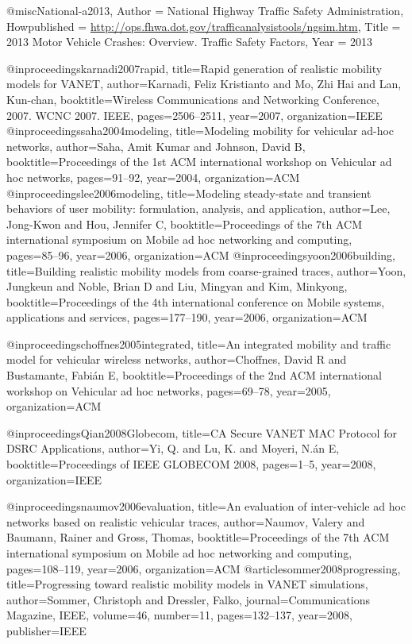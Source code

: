{{{{{{{{@misc{National-a2013,
	Author = {National Highway Traffic Safety Administration},
	Howpublished = {\url{http://ops.fhwa.dot.gov/trafficanalysistools/ngsim.htm}},
	Title = {2013 Motor Vehicle Crashes: Overview. Traffic Safety Factors},
	Year = {2013}
	}

	@inproceedings{karnadi2007rapid,
	  title={Rapid generation of realistic mobility models for VANET},
	  author={Karnadi, Feliz Kristianto and Mo, Zhi Hai and Lan, Kun-chan},
	  booktitle={Wireless Communications and Networking Conference, 2007. WCNC 2007. IEEE},
	  pages={2506--2511},
	  year={2007},
	  organization={IEEE}
	}
	@inproceedings{saha2004modeling,
  title={Modeling mobility for vehicular ad-hoc networks},
  author={Saha, Amit Kumar and Johnson, David B},
  booktitle={Proceedings of the 1st ACM international workshop on Vehicular ad hoc networks},
  pages={91--92},
  year={2004},
  organization={ACM}
}
@inproceedings{lee2006modeling,
  title={Modeling steady-state and transient behaviors of user mobility: formulation, analysis, and application},
  author={Lee, Jong-Kwon and Hou, Jennifer C},
  booktitle={Proceedings of the 7th ACM international symposium on Mobile ad hoc networking and computing},
  pages={85--96},
  year={2006},
  organization={ACM}
}
@inproceedings{yoon2006building,
  title={Building realistic mobility models from coarse-grained traces},
  author={Yoon, Jungkeun and Noble, Brian D and Liu, Mingyan and Kim, Minkyong},
  booktitle={Proceedings of the 4th international conference on Mobile systems, applications and services},
  pages={177--190},
  year={2006},
  organization={ACM}
}

@inproceedings{choffnes2005integrated,
	title={An integrated mobility and traffic model for vehicular wireless networks},
	author={Choffnes, David R and Bustamante, Fabi{\'a}n E},
	booktitle={Proceedings of the 2nd ACM international workshop on Vehicular ad hoc networks},
	pages={69--78},
	year={2005},
	organization={ACM}
}

@inproceedings{Qian2008Globecom,
	title={CA Secure VANET MAC Protocol for DSRC Applications},
	author={Yi, Q. and Lu, K. and Moyeri, N.{\'a}n E},
	booktitle={Proceedings of IEEE GLOBECOM 2008},
	pages={1--5},
	year={2008},
	organization={IEEE}
}





	@inproceedings{naumov2006evaluation,
  title={An evaluation of inter-vehicle ad hoc networks based on realistic vehicular traces},
  author={Naumov, Valery and Baumann, Rainer and Gross, Thomas},
  booktitle={Proceedings of the 7th ACM international symposium on Mobile ad hoc networking and computing},
  pages={108--119},
  year={2006},
  organization={ACM}
}
	@article{sommer2008progressing,
  title={Progressing toward realistic mobility models in VANET simulations},
  author={Sommer, Christoph and Dressler, Falko},
  journal={Communications Magazine, IEEE},
  volume={46},
  number={11},
  pages={132--137},
  year={2008},
  publisher={IEEE}
}




}}}}}}}}
